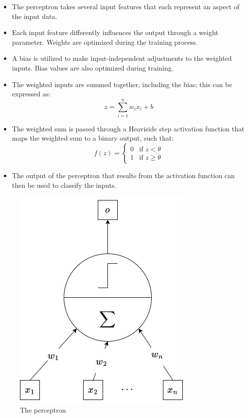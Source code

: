		\begin{itemize}
			\item The perceptron takes several input features that each represent an aspect of the input data.
			\item Each input feature differently influences the output through a weight parameter. Weights are optimized during the training process.
			\item A bias is utilized to make input-independent adjustments to the weighted inputs. Bias values are also optimized during training.
			\item The weighted inputs are summed together, including the bias; this can be expressed as:
			\begin{equation}
				z = \sum_{i=1}^n w_i x_i + b
			\end{equation}

			\item The weighted sum is passed through a Heaviside step activation function that maps the weighted sum to a binary output, such that:
			$$
			f(z) = 
			\begin{cases} 
				0 & \text{if } z < \theta \\ 
				1 & \text{if } z \geq \theta
			\end{cases}
			$$
			\item The output of the perceptron that results from the activation function can then be used to classify the inputs.
		\end{itemize}
		\bigskip


		\begin{figure}[H]
			\centering
			\includegraphics[width=0.5\linewidth]{img/img-perceptron}
			\caption{The perceptron}
			\label{fig:img-perceptron}
		\end{figure}
		
